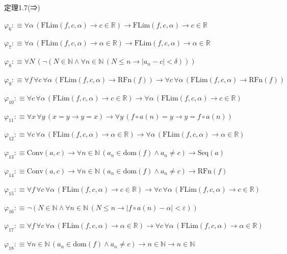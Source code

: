 \begin{fullproof}{定理1.7(⇒)}
\begin{abbrevlist}
\item $\varphi_{6} :\equiv \forall \alpha\,(\mathrm{FLim}(f,c,\alpha) \to c \in \mathbb{R}) \to \mathrm{FLim}(f,c,\alpha) \to c \in \mathbb{R}$
\item $\varphi_{7} :\equiv \forall \alpha\,(\mathrm{FLim}(f,c,\alpha) \to \alpha \in \mathbb{R}) \to \mathrm{FLim}(f,c,\alpha) \to \alpha \in \mathbb{R}$
\item $\varphi_{8} :\equiv \forall N\,(\neg (N \in \mathbb{N} \land \forall n \in \mathbb{N}\,(N \leq n \to \lvert a_{n} - c \rvert < \delta)))$
\item $\varphi_{9} :\equiv \forall f\,\forall c\,\forall \alpha\,(\mathrm{FLim}(f,c,\alpha) \to \mathrm{RFn}(f)) \to \forall c\,\forall \alpha\,(\mathrm{FLim}(f,c,\alpha) \to \mathrm{RFn}(f))$
\item $\varphi_{10} :\equiv \forall c\,\forall \alpha\,(\mathrm{FLim}(f,c,\alpha) \to c \in \mathbb{R}) \to \forall \alpha\,(\mathrm{FLim}(f,c,\alpha) \to c \in \mathbb{R})$
\item $\varphi_{11} :\equiv \forall x\,\forall y\,(x = y \to y = x) \to \forall y\,(f \circ a(n) = y \to y = f \circ a(n))$
\item $\varphi_{12} :\equiv \forall c\,\forall \alpha\,(\mathrm{FLim}(f,c,\alpha) \to \alpha \in \mathbb{R}) \to \forall \alpha\,(\mathrm{FLim}(f,c,\alpha) \to \alpha \in \mathbb{R})$
\item $\varphi_{13} :\equiv \mathrm{Conv}(a,c) \to \forall n \in \mathbb{N}\,(a_{n} \in \mathrm{dom}(f) \land a_{n} \neq c) \to \mathrm{Seq}(a)$
\item $\varphi_{14} :\equiv \mathrm{Conv}(a,c) \to \forall n \in \mathbb{N}\,(a_{n} \in \mathrm{dom}(f) \land a_{n} \neq c) \to \mathrm{RFn}(f)$
\item $\varphi_{15} :\equiv \forall f\,\forall c\,\forall \alpha\,(\mathrm{FLim}(f,c,\alpha) \to c \in \mathbb{R}) \to \forall c\,\forall \alpha\,(\mathrm{FLim}(f,c,\alpha) \to c \in \mathbb{R})$
\item $\varphi_{16} :\equiv \neg (N \in \mathbb{N} \land \forall n \in \mathbb{N}\,(N \leq n \to \lvert f \circ a(n) - \alpha \rvert < \varepsilon))$
\item $\varphi_{17} :\equiv \forall f\,\forall c\,\forall \alpha\,(\mathrm{FLim}(f,c,\alpha) \to \alpha \in \mathbb{R}) \to \forall c\,\forall \alpha\,(\mathrm{FLim}(f,c,\alpha) \to \alpha \in \mathbb{R})$
\item $\varphi_{18} :\equiv \forall n \in \mathbb{N}\,(a_{n} \in \mathrm{dom}(f) \land a_{n} \neq c) \to n \in \mathbb{N} \to n \in \mathbb{N}$

\end{abbrevlist}
\end{fullproof}
